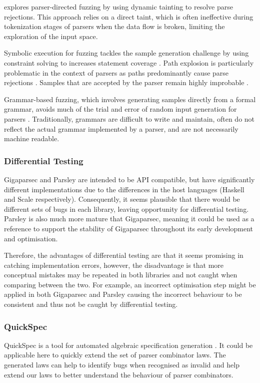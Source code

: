 \documentclass[11pt]{article}
\let\oldciteauthor\citeauthor
\renewcommand{\citeauthor}[1]{\oldciteauthor{#1} \cite{#1}}
\begin{document}
\citeauthor{parser-directed} explores parser-directed fuzzing by using dynamic tainting to resolve parse rejections. This approach relies on a direct taint, which is often ineffective during tokenization stages of parsers when the data flow is broken, limiting the exploration of the input space.

Symbolic execution for fuzzing tackles the sample generation challenge by using constraint solving to increases statement coverage \cite{klee}. Path explosion is particularly problematic in the context of parsers as paths predominantly cause parse rejections \cite{path-explosion}. Samples that are accepted by the parser remain highly improbable \cite{parser-directed}.

Grammar-based fuzzing, which involves generating samples directly from a formal grammar, avoids much of the trial and error of random input generation for parsers \cite{grammar}. Traditionally, grammars are difficult to write and maintain, often do not reflect the actual grammar implemented by a parser, and are not necessarily machine readable.

\subsubsection{Differential Testing}
Gigaparsec and Parsley are intended to be API compatible, but have significantly different implementations due to the differences in the host languages (Haskell and Scale respectively). Consequently, it seems plausible that there would be different sets of bugs in each library, leaving opportunity for differential testing. Parsley is also much more mature that Gigaparsec, meaning it could be used as a reference to support the stability of Gigaparsec throughout its early development and optimisation.

Therefore, the advantages of differential testing are that it seems promising in catching implementation errors, however, the disadvantage is that more conceptual mistakes may be repeated in both libraries and not caught when comparing between the two. For example, an incorrect optimisation step might be applied in both Gigaparsec and Parsley causing the incorrect behaviour to be consistent and thus not be caught by differential testing.

\subsubsection{QuickSpec}

QuickSpec is a tool for automated algebraic specification generation \cite{quickspec}. It could be applicable here to quickly extend the set of parser combinator laws. The generated laws can help to identify bugs when recognised as invalid and help extend our laws to better understand the behaviour of parser combinators.
\end{document}
